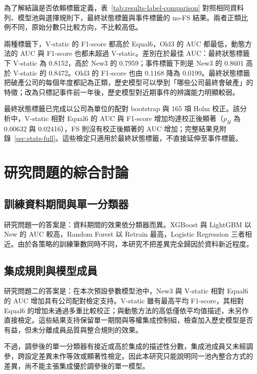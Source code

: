 為了解結論是否依賴標籤定義，表~\ref{tab:results-label-comparison} 對照相同資料列、模型池與選擇規則下，最終狀態標籤與事件標籤的 no-FS 結果。兩者正類比例不同，原始分數只比較方向，不比較高低。



兩種標籤下，V-static 的 F1-score 都高於 Equal6，Old3 的 AUC 都最低，動態方法的 AUC 與 F1-score 也都未超過 V-static。差別在於最佳 AUC：最終狀態標籤下 V-static 為 0.8152，高於 New3 的 0.7959；事件標籤下則是 New3 的 0.8601 高於 V-static 的 0.8472。Old3 的 F1-score 也由 0.1168 降為 0.0199。最終狀態標籤把破產公司的每個年度都記為正類，歷史模型可以學到「哪些公司最終會破產」的特徵；改為只標記事件前一年後，歷史模型對近期事件的辨識能力明顯較弱。

最終狀態標籤已完成以公司為單位的配對 bootstrap 與 165 項 Holm 校正。該分析中，V-static 相對 Equal6 的 AUC 與 F1-score 增加均達校正後顯著（\(p_H\) 為 0.00632 與 0.02416），FS 則沒有校正後顯著的 AUC 增加；完整結果見附錄~\ref{sec:stats-full}。這些檢定只適用於最終狀態標籤，不直接延伸至事件標籤。

\section{研究問題的綜合討論}\label{sec:results-discussion}

\subsection{訓練資料期間與單一分類器}

研究問題一的答案是：資料期間的效果依分類器而異。XGBoost 與 LightGBM 以 New 的 AUC 較高，Random Forest 以 Retrain 最高，Logistic Regression 三者相近。由於各策略的訓練筆數同時不同，本研究不把差異完全歸因於資料新近程度。

\subsection{集成規則與模型成員}

研究問題二的答案是：在本次預設參數模型池中，New3 與 V-static 相對 Equal6 的 AUC 增加具有公司配對檢定支持。V-static 雖有最高平均 F1-score，其相對 Equal6 的增加未通過多重比較校正；與動態方法的高低僅依平均值描述，未另作直接檢定。這些結果支持保留單一期間與等權集成控制組，檢查加入歷史模型是否有益，但未分離成員品質與整合規則的效果。

不過，調參後的單一分類器有接近或高於集成的描述性分數，集成池成員又未經調參，跨設定差異未作等效或顯著性檢定。因此本研究只能說明同一池內整合方式的差異，尚不能主張集成優於調參後的單一模型。

